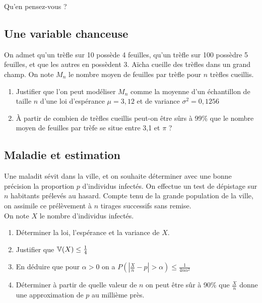 \documentclass[oneside,12pt]{book}          %
\begin{document}
Qu'en pensez-vous ? 



\subsection{Une variable chanceuse}
On admet qu'un trèfle sur 10 possède 4 feuilles, qu'un trèfle sur 100 possèdre 5 feuilles, et que les autres en possèdent 3. Aïcha cueille des trèfles dans un grand champ. On note $M_n$ le nombre moyen de feuilles par trèfle pour $n$ trèfles cueillis.
\begin{enumerate}
    \item Justifier que l'on peut modéliser $M_n$ comme la moyenne d'un échantillon de taille $n$ d'une loi d'espérance $\mu=3,12$ et de variance $\sigma^2=0,1256$
    \item À partir de combien de trèfles cueillis peut-on être sûrs à 99\% que le nombre moyen de feuilles par trèfe se situe entre 3,1 et $\pi$ ?
\end{enumerate}



\subsection{Maladie et estimation}
Une maladit sévit dans la ville, et on souhaite déterminer avec une bonne précision la proportion $p$ d'individus infectés. On effectue un test de dépistage sur $n$ habitants prélevés au hasard. Compte tenu de la grande population de la ville, on assimile ce prélèvement à $n$ tirages successifs sans remise.\\[5pt]
On note $X$ le nombre d'individus infectés.
\begin{enumerate}
    \item Déterminer la loi, l'espérance et la variance de $X$.
    \item Justifier que ${\mathbb V}(X)\leq\frac{1}{4}$
    \item En déduire que pour $\alpha>0$ on a $P\left(|\frac{X}{n}-p|>\alpha\right)\leq\frac{1}{4n\alpha^2}$
    \item Déterminer à partir de quelle valeur de $n$ on peut être sûr à 90\% que $\frac{X}{n}$ donne une approximation de $p$ au millième près.
\end{enumerate}



\end{document}
